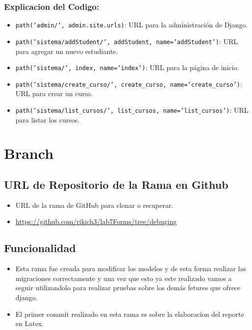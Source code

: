 \subsubsection*{Explicacion del Codigo:}

\begin{itemize}
\item \texttt{path('admin/', admin.site.urls)}: URL para la administración de Django.
\item \texttt{path('sistema/addStudent/', addStudent, name='addStudent')}: URL para agregar un nuevo estudiante.
\item \texttt{path('sistema/', index, name='index')}: URL para la página de inicio.
\item \texttt{path('sistema/create\_curso/', create\_curso, name='create\_curso')}: URL para crear un curso.
\item \texttt{path('sistema/list\_cursos/', list\_cursos, name='list\_cursos')}: URL para listar los cursos.
\end{itemize}

\section{Branch}
\subsection{URL de Repositorio de la Rama en Github}
\begin{itemize}
          \item URL de la rama de GitHub para clonar o recuperar.
          \item \url{https://github.com/rikich3/lab7Forms/tree/debuging}
\end{itemize}
\subsection{Funcionalidad}
\begin{itemize}
  \item Esta rama fue creada para modificar los modelos y de esta forma realizar las migraciones correctamente y 
  una vez que esto ya este realizado vamos a seguir utilizandolo para realizar pruebas sobre los demás fetures que ofrece django.
  \item El primer commit realizado en esta rama es sobre la elaboracion del reporte en Latex.
\end{itemize}
